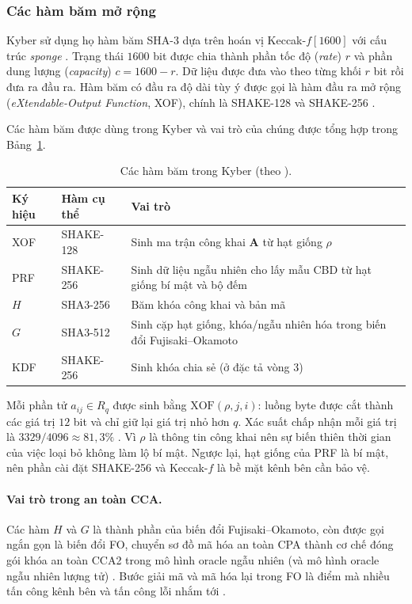 \documentclass[../LuanVan.tex]{subfiles}
\begin{document}
\subsubsection{Các hàm băm mở rộng}\label{subsec:hash}

Kyber sử dụng họ hàm băm SHA-3 dựa trên hoán vị Keccak-$f[1600]$ với cấu trúc \textit{sponge} \cite{Keccak11,FIPS202}. Trạng thái $1600$ bit được chia thành phần tốc độ (\textit{rate}) $r$ và phần dung lượng (\textit{capacity}) $c=1600-r$. Dữ liệu được đưa vào theo từng khối $r$ bit rồi đưa ra đầu ra. Hàm băm có đầu ra độ dài tùy ý được gọi là hàm đầu ra mở rộng (\textit{eXtendable-Output Function}, XOF), chính là SHAKE-128 và SHAKE-256 \cite{FIPS202}.

Các hàm băm được dùng trong Kyber và vai trò của chúng được tổng hợp trong Bảng~\ref{tab:hash}.

\begin{table}[H]
\centering
\caption{Các hàm băm trong Kyber (theo \cite{Avanzi21,FIPS203}).}
\label{tab:hash}
\begin{tabular}{l|l|p{8cm}}
\hline
\textbf{Ký hiệu} & \textbf{Hàm cụ thể} & \textbf{Vai trò} \\ \hline
XOF & SHAKE-128 & Sinh ma trận công khai $\mathbf{A}$ từ hạt giống $\rho$ \\
PRF & SHAKE-256 & Sinh dữ liệu ngẫu nhiên cho lấy mẫu CBD từ hạt giống bí mật và bộ đếm \\
$H$ & SHA3-256 & Băm khóa công khai và bản mã \\
$G$ & SHA3-512 & Sinh cặp hạt giống, khóa/ngẫu nhiên hóa trong biến đổi Fujisaki--Okamoto \\
KDF & SHAKE-256 & Sinh khóa chia sẻ (ở đặc tả vòng 3) \\ \hline
\end{tabular}
\end{table}

Mỗi phần tử $a_{ij}\in R_q$ được sinh bằng $\mathrm{XOF}(\rho, j, i)$: luồng byte được cắt thành các giá trị $12$ bit và chỉ giữ lại giá trị nhỏ hơn $q$. Xác suất chấp nhận mỗi giá trị là $3329/4096\approx 81{,}3\%$ \cite{Avanzi21}. Vì $\rho$ là thông tin công khai nên sự biến thiên thời gian của việc loại bỏ không làm lộ bí mật. Ngược lại, hạt giống của PRF là bí mật, nên phần cài đặt SHAKE-256 và Keccak-$f$ là bề mặt kênh bên cần bảo vệ.

\paragraph{Vai trò trong an toàn CCA.} Các hàm $H$ và $G$ là thành phần của biến đổi Fujisaki--Okamoto, còn được gọi ngắn gọn là biến đổi FO, chuyển sơ đồ mã hóa an toàn CPA thành cơ chế đóng gói khóa an toàn CCA2 trong mô hình oracle ngẫu nhiên (và mô hình oracle ngẫu nhiên lượng tử) \cite{Bos18,Avanzi21}. Bước giải mã và mã hóa lại trong FO là điểm mà nhiều tấn công kênh bên và tấn công lỗi nhắm tới \cite{Ravi20,PesslProkop21}.
\end{document}

